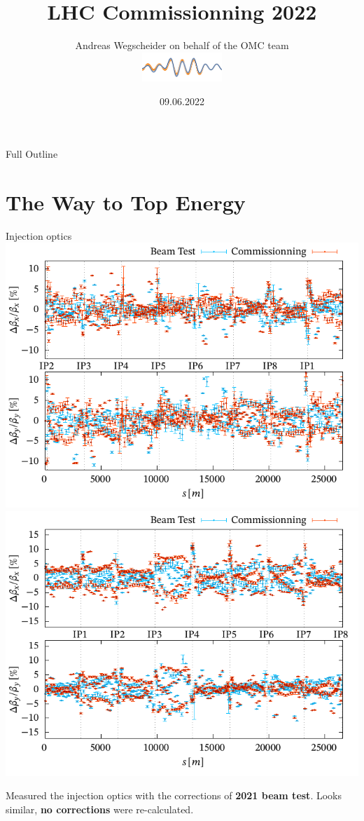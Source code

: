 \documentclass[11pt,usenames,dvipsnames,aspectratio=169]{beamer}
\author[OMC]{%
Andreas Wegscheider on behalf of the OMC team\\%
\centering%
\includegraphics[width=3cm]{omc-logo.pdf}%
}
\title[LHC 2022]{LHC Commissionning 2022}
\institute{CERN}
\date[09.06.22]{09.06.2022}
\newcommand{\highl}[1]{\textbf{#1}}
\begin{document}
\begin{frame}
    \titlepage
\end{frame}


\begin{frame}{Full Outline}
\tableofcontents
\end{frame}


\small

\section{The Way to Top Energy}



\begin{frame}{Injection optics}
    \includegraphics[width=0.49\linewidth]{images/beamtest/b1_bb.pdf}
    \hfill
    \includegraphics[width=0.49\linewidth]{images/beamtest/b2_bb.pdf}
    
    Measured the injection optics with the corrections of \highl{2021 beam test}.
    Looks similar, \highl{no corrections} were re-calculated.
\end{frame}


\end{document}
